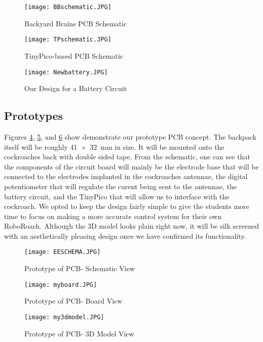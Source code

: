 \documentclass{article}
\begin{document}
\begin{figure}[ht!]
\centering
\texttt{[image: BBschematic.JPG]}
\caption{Backyard Brains PCB Schematic}
\label{fig:bbs}
\end{figure}

\begin{figure}[ht!]
\centering
\texttt{[image: TPschematic.JPG]}
\caption{TinyPico-based PCB Schematic}
\label{fig:tps}
\end{figure}

\begin{figure}[ht!]
\centering
\texttt{[image: Newbattery.JPG]}
\caption{Our Design for a Battery Circuit}
\label{fig:newbatt}
\end{figure}

\subsection{Prototypes}
 Figures \ref{fig:schematic}, \ref{fig:board}, and \ref{fig:3d} show demonstrate our prototype PCB concept. The backpack itself will be roughly \SI{41x32}{\milli\meter} in size. It will be mounted onto the cockroaches back with double sided tape. From the schematic, one can see that the components of the circuit board will mainly be the electrode base that will be connected to the electrodes implanted in the cockroaches antennae, the digital potentiometer that will regulate the curent being sent to the antennae, the battery circuit, and the TinyPico that will allow us to interface with the cockroach. We opted to keep the design fairly simple to give the students more time to focus on making a more accurate control system for their own RoboRoach. Although the 3D model looks plain right now, it will be silk screened with an aesthetically pleasing design once we have confirmed its functionality.

\begin{figure}[ht!]
\centering
\texttt{[image: EESCHEMA.JPG]}
\caption{Prototype of PCB- Schematic View}
\label{fig:schematic}
\end{figure}

\begin{figure}[ht!]
\centering
\texttt{[image: myboard.JPG]}
\caption{Prototype of PCB- Board View}
\label{fig:board}
\end{figure}

\begin{figure}[ht!]
\centering
\texttt{[image: my3dmodel.JPG]}
\caption{Prototype of PCB- 3D Model View}
\label{fig:3d}
\end{figure}
\end{document}
